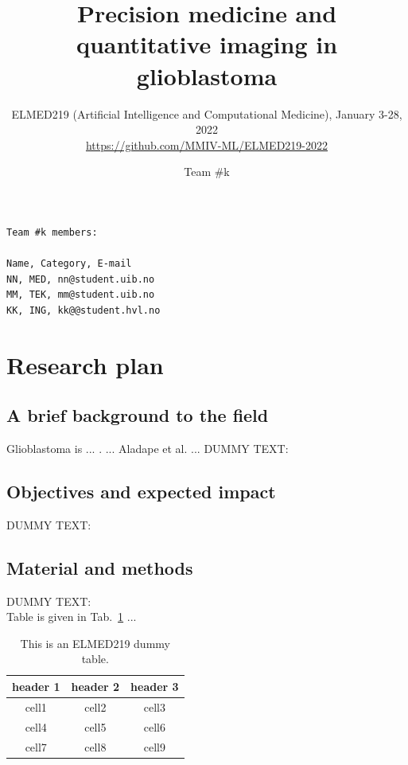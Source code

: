 \documentclass[11pt]{article}
\title{Precision medicine and quantitative imaging in glioblastoma}
\author{ELMED219 (Artificial Intelligence and Computational Medicine), January 3-28, 2022\\
{\footnotesize \url{https://github.com/MMIV-ML/ELMED219-2022}}}
\date{Team \#k}
\begin{document}
\maketitle

\begin{scriptsize}
\begin{verbatim}
Team #k members:

Name, Category, E-mail	
NN, MED, nn@student.uib.no
MM, TEK, mm@student.uib.no
KK, ING, kk@@student.hvl.no

\end{verbatim}
\end{scriptsize}

\vspace{3mm}
\section{Research plan} %

\vspace{3mm}

\subsection{A brief background to the field}

Glioblastoma is ...  \cite{Louis2019}. ...  Aladape et al. \cite{Aldape2019} ... 
DUMMY TEXT:
\lipsum[5]

\subsection{Objectives and expected impact}

DUMMY TEXT:
\lipsum[5]


\subsection{Material and methods}

DUMMY TEXT:
\lipsum[6] \\

Table is given in Tab.~\ref{tab:elmed219-dummy} ...

\begin{table}[H]
\begin{center}
\begin{tabular}{ |c|c|c| } 
 \hline
 header 1 & header 2 & header 3 \\ 
 \hline
 cell1 & cell2 & cell3 \\ 
 cell4 & cell5 & cell6 \\ 
 cell7 & cell8 & cell9 \\ 
 \hline
\end{tabular}
\end{center}
\caption{This is an ELMED219 dummy table.}
\label{tab:elmed219-dummy}
\end{table}
\end{document}
